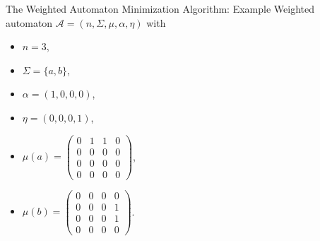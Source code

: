 \documentclass[rgb, pdf]{beamer}
\begin{document}
    
    \begin{frame}[allowframebreaks]{The Weighted Automaton Minimization Algorithm: Example}
         Weighted automaton $\mathcal{A} = (n, \Sigma, \mu, \alpha, \eta)$ with \\ \vspace{0.5cm}
            \begin{minipage}{0.25\textwidth}
                \begin{itemize}
                    \item $n = 3$,
                    \item $\Sigma = \{a, b\}$,
                    \item $\alpha = (1,0,0,0)$,
                    \item $\eta = (0,0,0,1)$,
                \end{itemize}
            \end{minipage} \begin{minipage}{0.3\textwidth}
             \begin{itemize}
                 \item $\mu(a) = \begin{pmatrix}
                                    0 & 1 & 1 & 0 \\
                                    0 & 0 & 0 & 0 \\
                                    0 & 0 & 0 & 0 \\
                                    0 & 0 & 0 & 0
                                \end{pmatrix}$, 
                    \item $\mu(b)= \begin{pmatrix}
                                    0 & 0 & 0 & 0 \\
                                    0 & 0 & 0 & 1 \\
                                    0 & 0 & 0 & 1 \\
                                    0 & 0 & 0 & 0
                                 \end{pmatrix}
                                $.
                \end{itemize}
            \end{minipage}
            \begin{minipage}{0.3\textwidth}
            \begin{center}
                \begin{tikzpicture}[shorten >=1pt,node distance=2cm,on grid,auto] 

\end{tikzpicture}
\end{center}
\end{minipage}
\end{frame}
\end{document}

